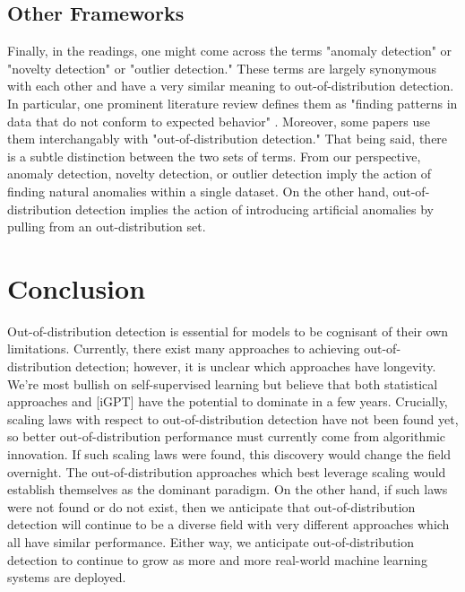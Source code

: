 \documentclass{article}
\begin{document}
\subsection{Other Frameworks}
Finally, in the readings, one might come across the terms "anomaly detection" or "novelty detection" or "outlier detection." These terms are largely synonymous with each other and have a very similar meaning to out-of-distribution detection. In particular, one prominent literature review defines them as "finding patterns in data that do not conform to expected behavior" \cite{chandola2009anomaly}. Moreover, some papers use them interchangably with "out-of-distribution detection." That being said, there is a subtle distinction between the two sets of terms. From our perspective, anomaly detection, novelty detection, or outlier detection imply the action of finding natural anomalies within a single dataset. On the other hand, out-of-distribution detection implies the action of introducing artificial anomalies by pulling from an out-distribution set. 

\section{Conclusion}
Out-of-distribution detection is essential for models to be cognisant of their own limitations. Currently, there exist many approaches to achieving out-of-distribution detection; however, it is unclear which approaches have longevity. We're most bullish on self-supervised learning but believe that both statistical approaches and [iGPT] have the potential to dominate in a few years. Crucially, scaling laws with respect to out-of-distribution detection have not been found yet, so better out-of-distribution performance must currently come from algorithmic innovation. If such scaling laws were found, this discovery would change the field overnight. The out-of-distribution approaches which best leverage scaling would establish themselves as the dominant paradigm. On the other hand, if such laws were not found or do not exist, then we anticipate that out-of-distribution detection will continue to be a diverse field with very different approaches which all have similar performance. Either way, we anticipate out-of-distribution detection to continue to grow as more and more real-world machine learning systems are deployed.



\end{document}
